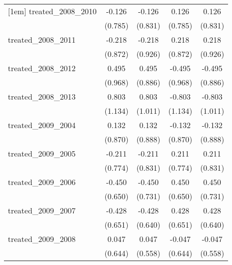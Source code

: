 {\begin{tabular}{l*{4}{c}}
[1em]
treated\_2008\_2010&      -0.126         &      -0.126         &       0.126         &       0.126         \\
            &     (0.785)         &     (0.831)         &     (0.785)         &     (0.831)         \\
[1em]
treated\_2008\_2011&      -0.218         &      -0.218         &       0.218         &       0.218         \\
            &     (0.872)         &     (0.926)         &     (0.872)         &     (0.926)         \\
[1em]
treated\_2008\_2012&       0.495         &       0.495         &      -0.495         &      -0.495         \\
            &     (0.968)         &     (0.886)         &     (0.968)         &     (0.886)         \\
[1em]
treated\_2008\_2013&       0.803         &       0.803         &      -0.803         &      -0.803         \\
            &     (1.134)         &     (1.011)         &     (1.134)         &     (1.011)         \\
[1em]
treated\_2009\_2004&       0.132         &       0.132         &      -0.132         &      -0.132         \\
            &     (0.870)         &     (0.888)         &     (0.870)         &     (0.888)         \\
[1em]
treated\_2009\_2005&      -0.211         &      -0.211         &       0.211         &       0.211         \\
            &     (0.774)         &     (0.831)         &     (0.774)         &     (0.831)         \\
[1em]
treated\_2009\_2006&      -0.450         &      -0.450         &       0.450         &       0.450         \\
            &     (0.650)         &     (0.731)         &     (0.650)         &     (0.731)         \\
[1em]
treated\_2009\_2007&      -0.428         &      -0.428         &       0.428         &       0.428         \\
            &     (0.651)         &     (0.640)         &     (0.651)         &     (0.640)         \\
[1em]
treated\_2009\_2008&       0.047         &       0.047         &      -0.047         &      -0.047         \\
            &     (0.644)         &     (0.558)         &     (0.644)         &     (0.558)         \\

\end{tabular}}
